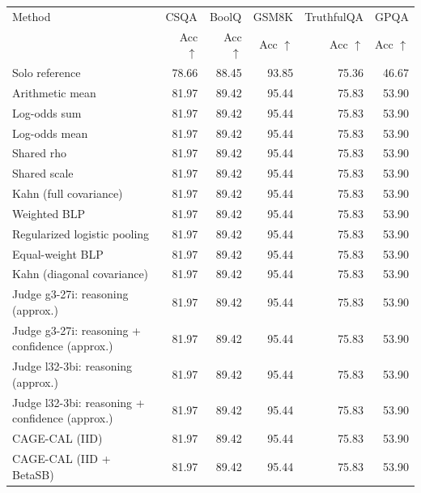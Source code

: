 \begin{tabular}{lrrrrr}
\toprule
Method & \multicolumn{1}{c}{CSQA} & \multicolumn{1}{c}{BoolQ} & \multicolumn{1}{c}{GSM8K} & \multicolumn{1}{c}{TruthfulQA} & \multicolumn{1}{c}{GPQA} \\
 & Acc $\uparrow$ & Acc $\uparrow$ & Acc $\uparrow$ & Acc $\uparrow$ & Acc $\uparrow$ \\
\midrule
Solo reference & 78.66 & 88.45 & 93.85 & 75.36 & 46.67 \\
Arithmetic mean & 81.97 & 89.42 & 95.44 & 75.83 & 53.90 \\
Log-odds sum & 81.97 & 89.42 & 95.44 & 75.83 & 53.90 \\
Log-odds mean & 81.97 & 89.42 & 95.44 & 75.83 & 53.90 \\
Shared rho & 81.97 & 89.42 & 95.44 & 75.83 & 53.90 \\
Shared scale & 81.97 & 89.42 & 95.44 & 75.83 & 53.90 \\
Kahn (full covariance) & 81.97 & 89.42 & 95.44 & 75.83 & 53.90 \\
Weighted BLP & 81.97 & 89.42 & 95.44 & 75.83 & 53.90 \\
Regularized logistic pooling & 81.97 & 89.42 & 95.44 & 75.83 & 53.90 \\
Equal-weight BLP & 81.97 & 89.42 & 95.44 & 75.83 & 53.90 \\
Kahn (diagonal covariance) & 81.97 & 89.42 & 95.44 & 75.83 & 53.90 \\
Judge g3-27i: reasoning (approx.) & 81.97 & 89.42 & 95.44 & 75.83 & 53.90 \\
Judge g3-27i: reasoning + confidence (approx.) & 81.97 & 89.42 & 95.44 & 75.83 & 53.90 \\
Judge l32-3bi: reasoning (approx.) & 81.97 & 89.42 & 95.44 & 75.83 & 53.90 \\
Judge l32-3bi: reasoning + confidence (approx.) & 81.97 & 89.42 & 95.44 & 75.83 & 53.90 \\
CAGE-CAL (IID) & 81.97 & 89.42 & 95.44 & 75.83 & 53.90 \\
CAGE-CAL (IID + BetaSB) & 81.97 & 89.42 & 95.44 & 75.83 & 53.90 \\
\bottomrule
\end{tabular}
